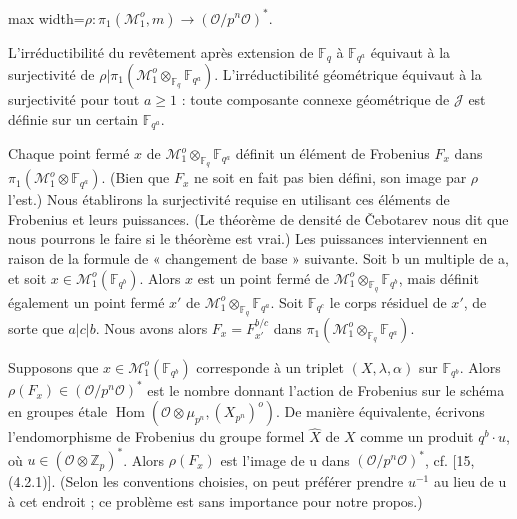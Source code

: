 \documentclass[11pt]{article}
\newcommand{\DFormula}[1]{\par\smallskip\noindent\begin{adjustbox}{max width=\linewidth}$\displaystyle #1$\end{adjustbox}\par\smallskip}
\begin{document}
\par
\DFormula{\rho :\pi _{1}(\mathcal{M}_{1}^{o},m)\to (\mathcal{O}/p^{n}\mathcal{O})^{\ast}.}
\par
L’irréductibilité du revêtement après extension de \(\mathbb{F}_{q}\) à \(\mathbb{F}_{q^{a}}\) équivaut à la surjectivité de \(\rho \vert \pi _{1}(\mathcal{M}_{1}^{o}\otimes _{\mathbb{F}_{q}}\mathbb{F}_{q^{a}})\). L’irréductibilité géométrique équivaut à la surjectivité pour tout \(a\geq 1\) : toute composante connexe géométrique de \(\mathcal{J}\) est définie sur un certain \(\mathbb{F}_{q^{a}}\).\par
\par
Chaque point fermé \(x\) de \(\mathcal{M}_{1}^{o}\otimes _{\mathbb{F}_{q}}\mathbb{F}_{q^{a}}\) définit un élément de Frobenius \(F_{x}\) dans \(\pi _{1}(\mathcal{M}_{1}^{o}\otimes \mathbb{F}_{q^{a}})\). (Bien que \(F_{x}\) ne soit en fait pas bien défini, son image par \(\rho \) l’est.) Nous établirons la surjectivité requise en utilisant ces éléments de Frobenius et leurs puissances. (Le théorème de densité de Čebotarev nous dit que nous pourrons le faire si le théorème est vrai.) Les puissances interviennent en raison de la formule de « changement de base » suivante. Soit b un multiple de a, et soit \(x\in \mathcal{M}_{1}^{o}(\mathbb{F}_{q^{b}})\). Alors \(x\) est un point fermé de \(\mathcal{M}_{1}^{o}\otimes _{\mathbb{F}_{q}}\mathbb{F}_{q^{b}}\), mais définit également un point fermé \(x'\) de \(\mathcal{M}_{1}^{o}\otimes _{\mathbb{F}_{q}}\mathbb{F}_{q^{a}}\). Soit \(\mathbb{F}_{q^{c}}\) le corps résiduel de \(x'\), de sorte que \(a\vert c\vert b\). Nous avons alors \(F_{x}=F_{x'}^{b/c}\) dans \(\pi _{1}(\mathcal{M}_{1}^{o}\otimes _{\mathbb{F}_{q}}\mathbb{F}_{q^{a}})\).\par
\par
Supposons que \(x\in \mathcal{M}_{1}^{o}(\mathbb{F}_{q^{b}})\) corresponde à un triplet \((X,\lambda ,\alpha )\) sur \(\mathbb{F}_{q^{b}}\). Alors \(\rho (F_{x})\in (\mathcal{O}/p^{n}\mathcal{O})^{\ast}\) est le nombre donnant l’action de Frobenius sur le schéma en groupes étale \(\operatorname{Hom}(\mathcal{O}\otimes \mu _{p^{n}},(X_{p^{n}})^{o})\). De manière équivalente, écrivons l’endomorphisme de Frobenius du groupe formel \(\widehat{X}\) de \(X\) comme un produit \(q^{b}\cdot u\), où \(u\in (\mathcal{O}\otimes \mathbb{Z}_{p})^{\ast}\). Alors \(\rho (F_{x})\) est l’image de u dans \((\mathcal{O}/p^{n}\mathcal{O})^{\ast}\), cf. [15, (4.2.1)]. (Selon les conventions choisies, on peut préférer prendre \(u^{-1}\) au lieu de u à cet endroit ; ce problème est sans importance pour notre propos.)\par
\end{document}
